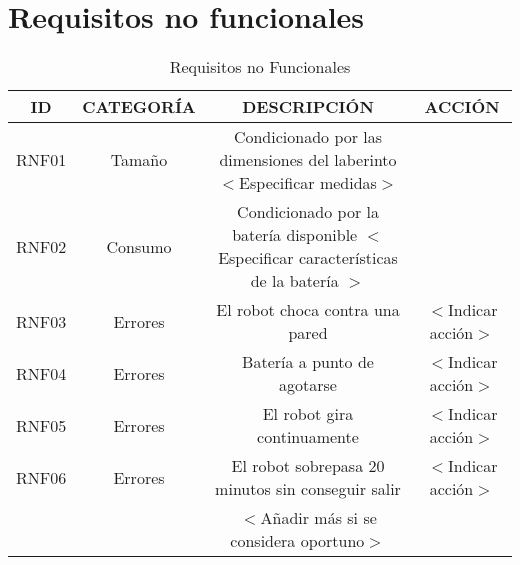 \section{Requisitos no funcionales}
\begin{center}
\begin{table}[h!]
  \begin{adjustbox}{max width=\textwidth}
  \begin{tabular}{|c|c|c|c|}
    \hline
    ID & CATEGORÍA & DESCRIPCIÓN & ACCIÓN \\ \hline
    \rowcolor{blue!20}

    RNF01 & Tamaño & Condicionado por las dimensiones del laberinto $<$Especificar medidas$>$ &   \\ \hline
    \rowcolor{green!40}

    RNF02 & Consumo & Condicionado por la batería disponible $<$Especificar características de la batería $>$ &  \\ \hline
    \rowcolor{red!25}

    RNF03 & Errores & El robot choca contra una pared & $<$Indicar acción$>$ \\ \hline
    \rowcolor{red!25}

    RNF04 & Errores & Batería a punto de agotarse & $<$Indicar acción$>$ \\ \hline
    \rowcolor{red!25}

    RNF05 & Errores & El robot gira continuamente & $<$Indicar acción$>$ \\ \hline
    \rowcolor{red!25}

    RNF06 & Errores & El robot sobrepasa 20 minutos sin conseguir salir & $<$Indicar acción$>$ \\ \hline

     &  & $<$Añadir más si se considera oportuno$>$ &  \\ \hline

  \end{tabular}
\end{adjustbox}
  \caption{Requisitos no Funcionales}
  \label{ReqNoFuncionales}

\end{table}
\end{center}
